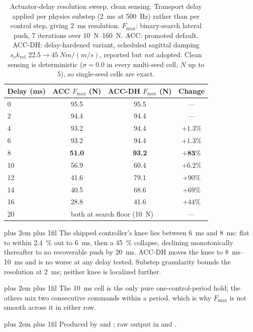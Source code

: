 \documentclass[conference]{IEEEtran}
\newcommand{\tabnote}{\par\leftskip=0pt\rightskip=0pt plus 2em%
  \parfillskip=0pt plus 1fil\relax}
\begin{document}
\begin{table}[t]
\centering
\caption{Actuator-delay resolution sweep, clean sensing. Transport delay applied per physics substep (\SI{2}{ms} at \SI{500}{Hz}) rather than per control step, giving \SI{2}{ms} resolution. $F_{\max}$: binary-search lateral push, \num{7} iterations over \SIrange{10}{160}{N}. ACC: promoted default. ACC-DH: delay-hardened variant, scheduled sagittal damping $s_v k_{\text{vel}}$ \SI{22.5}{}${\rightarrow}\SI{45}{Nm/(m/s)}$, reported but \emph{not} adopted. Clean sensing is deterministic ($\sigma{=}\num{0.0}$ in every multi-seed cell, $N$ up to \num{5}), so single-seed cells are exact.}
\label{tab:delay_cliff}
\footnotesize
\begin{tabular}{@{}lccc@{}}
\toprule
Delay (ms) & ACC $F_{\max}$ (N) & ACC-DH $F_{\max}$ (N) & Change \\
\midrule
0  & 95.5 & 95.5 & --- \\
2  & 94.4 & 94.4 & --- \\
4  & 93.2 & 94.4 & $+1.3\%$ \\
6  & 93.2 & 94.4 & $+1.3\%$ \\
\midrule
8  & \textbf{51.0} & \textbf{93.2} & $\mathbf{+83\%}$ \\
10 & 56.9 & 60.4 & $+6.2\%$ \\
12 & 41.6 & 79.1 & $+90\%$ \\
14 & 40.5 & 68.6 & $+69\%$ \\
16 & 28.8 & 41.6 & $+44\%$ \\
20 & \multicolumn{2}{c}{both at search floor (\SI{10}{N})} & --- \\
\bottomrule
\end{tabular}
\vspace{2pt}\tabnote\noindent
The shipped controller's knee lies between \SI{6}{ms} and \SI{8}{ms}: flat to within \SI{2.4}{\percent} out to \SI{6}{ms}, then a \SI{45}{\percent} collapse, declining monotonically thereafter to no recoverable push by \SI{20}{ms}. ACC-DH moves the knee to \SIrange{8}{10}{ms} and is no worse at any delay tested. Substep granularity bounds the resolution at \SI{2}{ms}; neither knee is localized further.
\tabnote\noindent
The \SI{10}{ms} cell is the only pure one-control-period hold; the others mix two consecutive commands within a period, which is why $F_{\max}$ is not smooth across it in either row.
\tabnote\noindent
Produced by  and
; raw output in
 and .
\end{table}
\end{document}
